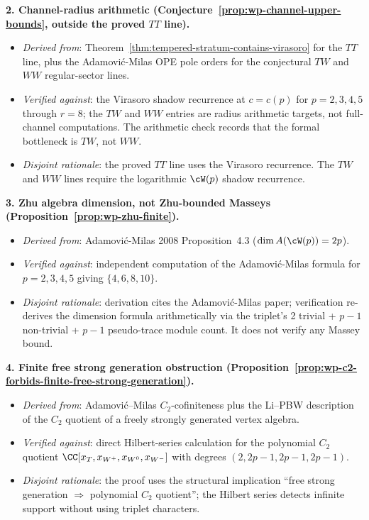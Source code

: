 \textbf{2. Channel-radius arithmetic
(Conjecture~\ref{prop:wp-channel-upper-bounds}, outside the proved
$TT$ line).}
\begin{itemize}[nosep]
\item \emph{Derived from}: Theorem~\ref{thm:tempered-stratum-contains-virasoro}
 for the $TT$ line, plus the Adamovi\'c-Milas OPE pole orders for
 the conjectural $TW$ and $WW$ regular-sector lines.
\item \emph{Verified against}: the Virasoro shadow recurrence
 at $c = c(p)$ for $p = 2, 3, 4, 5$ through $r = 8$; the $TW$ and
 $WW$ entries are radius arithmetic targets, not full-channel
 computations. The arithmetic check records that the formal bottleneck
 is $TW$, not $WW$.
\item \emph{Disjoint rationale}: the proved $TT$ line uses the
 Virasoro recurrence. The $TW$ and $WW$ lines require the logarithmic
 $\cW(p)$ shadow recurrence.
\end{itemize}

\textbf{3. Zhu algebra dimension, not Zhu-bounded Masseys
(Proposition~\ref{prop:wp-zhu-finite}).}
\begin{itemize}[nosep]
\item \emph{Derived from}: Adamovi\'c-Milas 2008
 Proposition~4.3 ($\dim A(\cW(p)) = 2p$).
\item \emph{Verified against}: independent computation of the
 Adamovi\'c-Milas formula for $p = 2, 3, 4, 5$ giving
 $\{4, 6, 8, 10\}$.
\item \emph{Disjoint rationale}: derivation cites the Adamovi\'c-Milas
 paper; verification re-derives the dimension formula arithmetically
 via the triplet's 2 trivial + $p-1$ non-trivial + $p-1$ pseudo-trace
 module count. It does not verify any Massey bound.
\end{itemize}

\textbf{4. Finite free strong generation obstruction
(Proposition~\ref{prop:wp-c2-forbids-finite-free-strong-generation}).}
\begin{itemize}[nosep]
\item \emph{Derived from}: Adamovi\'c--Milas $C_2$-cofiniteness plus
 the Li--PBW description of the $C_2$ quotient of a freely strongly
 generated vertex algebra.
\item \emph{Verified against}: direct Hilbert-series calculation for the
 polynomial $C_2$ quotient
 $\CC[x_T,x_{W^+},x_{W^0},x_{W^-}]$ with degrees
 $(2,2p-1,2p-1,2p-1)$.
\item \emph{Disjoint rationale}: the proof uses the structural
 implication ``free strong generation $\Rightarrow$ polynomial
 $C_2$ quotient''; the Hilbert series detects infinite support
 without using triplet characters.
\end{itemize}

